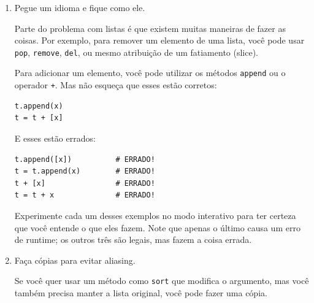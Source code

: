\begin{enumerate}
\item Pegue um idioma e fique como ele.

Parte do problema com listas é que existem muitas maneiras 
de fazer as coisas. Por exemplo, para remover um elemento
de uma lista, você pode usar {\tt pop}, {\tt remove}, {\tt del},
ou mesmo atribuição de um fatiamento (slice).

Para adicionar um elemento, você pode utilizar os métodos {\tt append} 
ou o operador {\tt +}. Mas não esqueça que esses estão corretos:

\beforeverb
\begin{verbatim}
t.append(x)
t = t + [x]
\end{verbatim}
\afterverb

E esses estão errados:

\beforeverb
\begin{verbatim}
t.append([x])          # ERRADO!
t = t.append(x)        # ERRADO!
t + [x]                # ERRADO!
t = t + x              # ERRADO!
\end{verbatim}
\afterverb

Experimente cada um desses exemplos no modo interativo para ter
certeza que você entende o que eles fazem. Note que apenas o último
causa um erro de runtime; os outros três são legais, mas fazem a coisa
errada.


\item Faça cópias para evitar aliasing.


Se você quer usar um método como {\tt sort} que modifica
o argumento, mas você também precisa manter a lista original,
você pode fazer uma cópia.


\end{enumerate}
